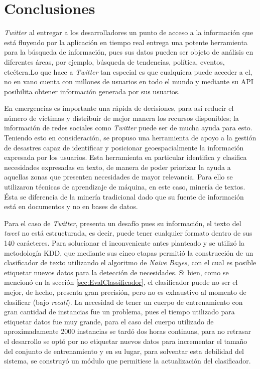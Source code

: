 \chapter{Conclusiones}
\label{cap:conclusiones}

\textit{Twitter} al entregar a los desarrolladores un punto de acceso a la información que está fluyendo por la aplicación en tiempo real entrega una potente herramienta para la búsqueda de información, pues sus datos pueden ser objeto de análisis en diferentes áreas, por ejemplo, búsqueda de tendencias, política, eventos, etcétera.Lo que hace a \textit{Twitter} tan especial es que cualquiera puede acceder a el, no en vano cuenta con millones de usuarios en todo el mundo y mediante su API posibilita obtener información generada por sus usuarios. 

En emergencias es importante una rápida de decisiones, para así reducir el número de víctimas y distribuir de mejor manera los recursos disponibles; la información de redes sociales como \textit{Twitter} puede ser de mucha ayuda para esto. Teniendo esto en consideración, se propuso una herramienta de apoyo a la gestión de desastres capaz de identificar y posicionar geoespacialmente la información expresada por los usuarios. Esta herramienta en particular identifica y clasifica necesidades expresadas en texto, de manera de poder priorizar la ayuda a aquellas zonas que presenten necesidades de mayor relevancia. Para ello se utilizaron técnicas de aprendizaje de máquina, en este caso, minería de textos. Ésta se diferencia de la minería tradicional dado que su fuente de información está en documentos y no en bases de datos. 

Para el caso de \textit{Twitter}, presenta un desafío pues su información, el texto del \textit{tweet} no está estructurada, es decir, puede tener cualquier formato dentro de sus 140 carácteres. Para solucionar el inconveniente antes planteado y se utilizó la metodología KDD, que mediante sus cinco etapas permitió la construcción de un clasificador de texto utilizando el algoritmo de \textit{Naïve Bayes}, con el cual es posible etiquetar nuevos datos para la detección de necesidades. Si bien, como se mencionó en la sección \ref{sec:EvalClassificador}, el clasificador puede no ser el mejor, de hecho, presenta gran precisión, pero no es exhaustivo al momento de clasificar (bajo \textit{recall}). La necesidad de tener un cuerpo de entrenamiento con gran cantidad de instancias fue un problema, pues el tiempo utilizado para etiquetar datos fue muy grande, para el caso del cuerpo utilizado de aproximadamente 2000 instancias se tardó dos horas continuas, para no retrasar el desarrollo se optó por no etiquetar nuevos datos para incrementar el tamaño del conjunto de entrenamiento y en su lugar, para solventar esta debilidad del sistema, se construyó un módulo que permitiese la actualización del clasificador.


